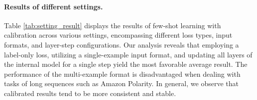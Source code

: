 \paragraph{Results of different settings.}
Table \ref{tab:setting_result} displays the results of few-shot learning with calibration across various settings, encompassing different loss types, input formats, and layer-step configurations. Our analysis reveals that employing a label-only loss, utilizing a single-example input format, and updating all layers of the internal model for a single step yield the most favorable average result. The performance of the multi-example format is disadvantaged when dealing with tasks of long sequences such as Amazon Polarity. In general, we observe that calibrated results tend to be more consistent and stable.
\begin{table}[hbt]
\centering
\caption{Few-shot ($k=32$) results with different loss types, input formats, and layer-step configurations with a fixed compute budget, with calibration.}
\label{tab:setting_result}
\end{table}
